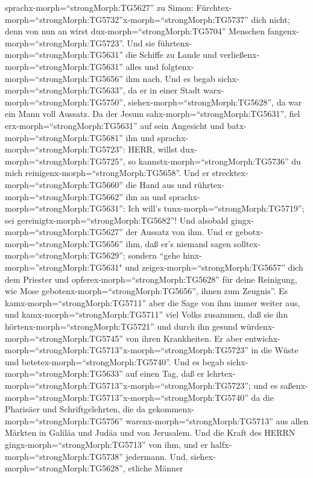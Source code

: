 sprachx-morph=``strongMorph:TG5627'' zu Simon:
Fürchtex-morph=``strongMorph:TG5732''\textbar x-morph=``strongMorph:TG5737''
dich nicht; denn von nun an wirst dux-morph=``strongMorph:TG5704''
Menschen fangenx-morph=``strongMorph:TG5723''.  Und sie
führtenx-morph=``strongMorph:TG5631'' die Schiffe zu Lande und
verließenx-morph=``strongMorph:TG5631'' alles und
folgtenx-morph=``strongMorph:TG5656'' ihm nach.  Und es
begab sichx-morph=``strongMorph:TG5633'', da er in einer Stadt
warx-morph=``strongMorph:TG5750'', siehex-morph=``strongMorph:TG5628'',
da war ein Mann voll Aussatz. Da der Jesum
sahx-morph=``strongMorph:TG5631'', fiel erx-morph=``strongMorph:TG5631''
auf sein Angesicht und batx-morph=``strongMorph:TG5681'' ihn und
sprachx-morph=``strongMorph:TG5723'': HERR, willst
dux-morph=``strongMorph:TG5725'', so
kannstx-morph=``strongMorph:TG5736'' du mich
reinigenx-morph=``strongMorph:TG5658''.  Und er
strecktex-morph=``strongMorph:TG5660'' die Hand aus und
rührtex-morph=``strongMorph:TG5662'' ihn an und
sprachx-morph=``strongMorph:TG5631'': Ich will's
tunx-morph=``strongMorph:TG5719''; sei
gereinigtx-morph=``strongMorph:TG5682''! Und alsobald
gingx-morph=``strongMorph:TG5627'' der Aussatz von ihm. 
Und er gebotx-morph=``strongMorph:TG5656'' ihm, daß er's niemand sagen
solltex-morph=``strongMorph:TG5629''; sondern ``gehe
hinx-morph=''strongMorph:TG5631" und zeigex-morph=``strongMorph:TG5657''
dich dem Priester und opferex-morph=``strongMorph:TG5628'' für deine
Reinigung, wie Mose gebotenx-morph=``strongMorph:TG5656'', ihnen zum
Zeugnis''.  Es kamx-morph=``strongMorph:TG5711'' aber die
Sage von ihm immer weiter aus, und kamx-morph=``strongMorph:TG5711''
viel Volks zusammen, daß sie ihn hörtenx-morph=``strongMorph:TG5721''
und durch ihn gesund würdenx-morph=``strongMorph:TG5745'' von ihren
Krankheiten.  Er aber
entwichx-morph=``strongMorph:TG5713''x-morph=``strongMorph:TG5723'' in
die Wüste und betetex-morph=``strongMorph:TG5740''.  Und es
begab sichx-morph=``strongMorph:TG5633'' auf einen Tag, daß er
lehrtex-morph=``strongMorph:TG5713''x-morph=``strongMorph:TG5723''; und
es saßenx-morph=``strongMorph:TG5713''x-morph=``strongMorph:TG5740'' da
die Pharisäer und Schriftgelehrten, die da
gekommenx-morph=``strongMorph:TG5756''
warenx-morph=``strongMorph:TG5713'' aus allen Märkten in Galiläa und
Judäa und von Jerusalem. Und die Kraft des HERRN
gingx-morph=``strongMorph:TG5713'' von ihm, und er
halfx-morph=``strongMorph:TG5738'' jedermann.  Und,
siehex-morph=``strongMorph:TG5628'', etliche Männer
